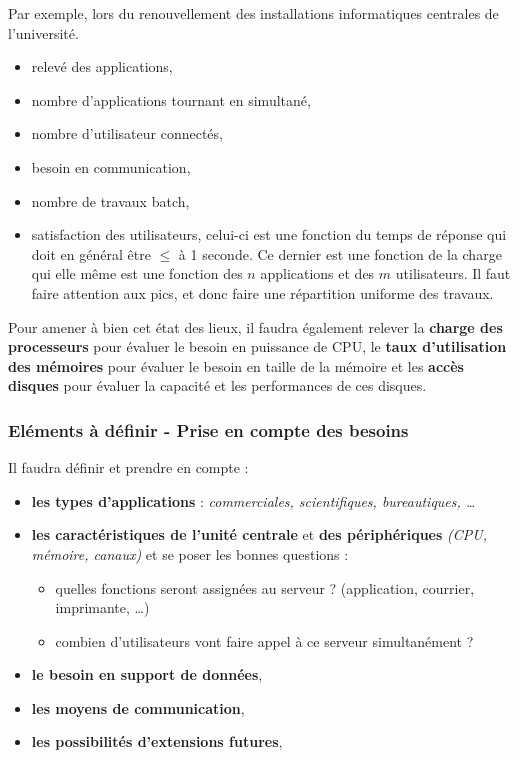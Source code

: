 \documentclass[10pt,a4paper,oneside,titlepage]{report}
\newcommand{\titre}[1]{\textcolor{title}{#1}}
\newcommand{\strong}[1]{\textbf{\titre{#1}}}
\begin{document}
Par exemple, lors du renouvellement des installations informatiques centrales de
l'université.
\begin{itemize}
\item relevé des applications,
\item nombre d'applications tournant en simultané,
\item nombre d'utilisateur connectés,
\item besoin en communication,
\item nombre de travaux batch,
\item satisfaction des utilisateurs, celui-ci est une fonction du temps de
réponse qui doit en général être $\leq$ à 1 seconde. Ce dernier est une
fonction de la charge qui elle même est une fonction des $n$ applications et
des $m$ utilisateurs. Il faut faire attention aux pics, et donc faire une
répartition uniforme des travaux.
\end{itemize}

Pour amener à bien cet état des lieux, il faudra également relever la
\strong{charge des processeurs} pour évaluer le besoin en puissance de CPU, le
\strong{taux d'utilisation des mémoires} pour évaluer le besoin en taille de la
mémoire et les \strong{accès disques} pour évaluer la capacité et les
performances de ces disques.

\subsubsection{Eléments à définir - Prise en compte des besoins}

Il faudra définir et prendre en compte :
\begin{itemize}
\item \textbf{les types d'applications} : \textit{commerciales, scientifiques,
bureautiques, \dots}
\item \textbf{les caractéristiques de l'unité centrale} et
\textbf{des périphériques} \textit{(CPU, mémoire, canaux)} et se poser les
bonnes questions :
\begin{itemize}
\item quelles fonctions seront assignées au serveur ? (application, courrier,
imprimante, \dots)
\item combien d'utilisateurs vont faire appel à ce serveur simultanément ?
\end{itemize}
\item \textbf{le besoin en support de données},
\item \textbf{les moyens de communication},
\item \textbf{les possibilités d'extensions futures},
\end{itemize}
\end{document}
